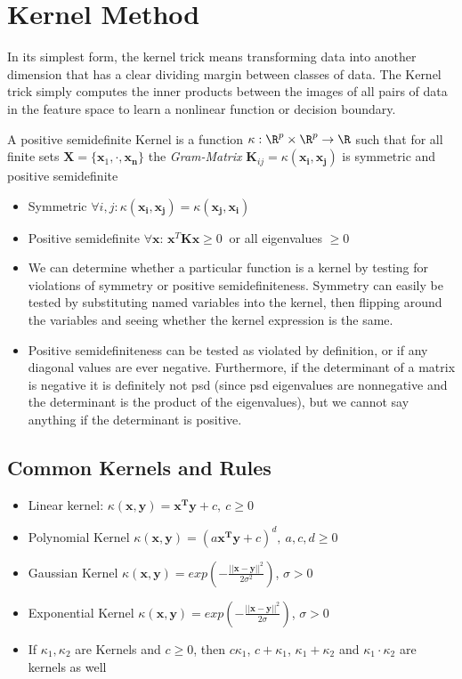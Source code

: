\documentclass[english]{latex4ei/latex4ei_sheet}
\begin{document}
\section{Kernel Method}
\begin{sectionbox}
In its simplest form, the kernel trick means transforming data into another dimension that has a clear dividing margin between classes of data. The Kernel trick simply computes the inner products between the images of all pairs of data in the feature space to learn a nonlinear function or decision boundary.
\begin{emphbox}
    A positive semidefinite Kernel is a function $\kappa: \R^{p}\times \R^{p}\rightarrow\R$ such that for all finite sets $\mathbf{X}=\{\mathbf{x}_1,\cdot,\mathbf{x_n}\}$ the \emph{Gram-Matrix} $\mathbf{K}_{ij} = \kappa(\mathbf{x_i,x_j})$ is symmetric and positive semidefinite  
\end{emphbox}
\begin{itemize}
    \item Symmetric $\forall i,j: \kappa(\mathbf{x_i,x_j})=\kappa(\mathbf{x_j,x_i})$
    \item Positive semidefinite $\forall \mathbf{x}$: $\mathbf{x}^T\mathbf{Kx}\ge 0\ $ or all eigenvalues $\ge 0$
    \item We can determine whether a particular function is a kernel by testing for violations of symmetry or positive semidefiniteness.
    Symmetry can easily be tested by substituting named variables into the kernel, then flipping around the variables and seeing whether the kernel expression is the same.
    \item Positive semidefiniteness can be tested as violated by definition, or if any diagonal values are ever negative. Furthermore, if the determinant of a matrix is negative it is definitely not psd (since psd eigenvalues are nonnegative and the determinant is the product of the eigenvalues), but we cannot say anything if the determinant is positive.
\end{itemize}
\subsection{Common Kernels and Rules}
\begin{itemize}
    \item Linear kernel: $\kappa(\mathbf{x,y})=\mathbf{x^Ty}+c, \ c\ge0$
    \item Polynomial Kernel $\kappa(\mathbf{x,y})=(a\mathbf{x^Ty}+c)^d,\ a,c,d\ge0 $
    \item Gaussian Kernel $\kappa(\mathbf{x,y})=exp(-\frac{||\mathbf{x-y}||^2}{2\sigma^2})$, $\sigma>0$
    \item Exponential Kernel $\kappa(\mathbf{x,y})=exp(-\frac{||\mathbf{x-y}||^2}{2\sigma})$, $\sigma>0$
    \item If $\kappa_1, \kappa_2$ are Kernels and $c\ge0$, then $c\kappa_1$, $c+\kappa_1$, $\kappa_1+\kappa_2$ and $\kappa_1\cdot\kappa_2$ are kernels as well
\end{itemize}
\end{sectionbox}
\end{document}
